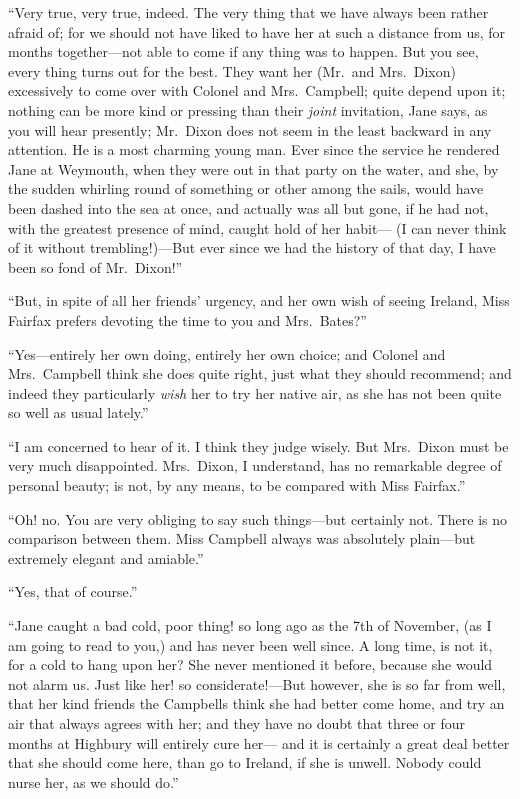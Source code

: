 ``Very true, very true, indeed.  The very thing that we have always
been rather afraid of; for we should not have liked to have her
at such a distance from us, for months together---not able to come
if any thing was to happen.  But you see, every thing turns out
for the best.  They want her (Mr.\ and Mrs.\ Dixon) excessively to
come over with Colonel and Mrs.\ Campbell; quite depend upon it;
nothing can be more kind or pressing than their \emph{joint} invitation,
Jane says, as you will hear presently; Mr.\ Dixon does not seem in the
least backward in any attention.  He is a most charming young man.
Ever since the service he rendered Jane at Weymouth, when they were
out in that party on the water, and she, by the sudden whirling
round of something or other among the sails, would have been dashed
into the sea at once, and actually was all but gone, if he had not,
with the greatest presence of mind, caught hold of her habit---%
(I can never think of it without trembling!)---But ever since we
had the history of that day, I have been so fond of Mr.\ Dixon!''

``But, in spite of all her friends' urgency, and her own wish
of seeing Ireland, Miss Fairfax prefers devoting the time to you
and Mrs.\ Bates?''

``Yes---entirely her own doing, entirely her own choice; and Colonel
and Mrs.\ Campbell think she does quite right, just what they
should recommend; and indeed they particularly \emph{wish} her to try
her native air, as she has not been quite so well as usual lately.''

``I am concerned to hear of it.  I think they judge wisely.
But Mrs.\ Dixon must be very much disappointed.  Mrs.\ Dixon,
I understand, has no remarkable degree of personal beauty; is not,
by any means, to be compared with Miss Fairfax.''

``Oh! no.  You are very obliging to say such things---but certainly not.
There is no comparison between them.  Miss Campbell always was
absolutely plain---but extremely elegant and amiable.''

``Yes, that of course.''

``Jane caught a bad cold, poor thing! so long ago as the 7th
of November, (as I am going to read to you,) and has never been
well since.  A long time, is not it, for a cold to hang upon her?
She never mentioned it before, because she would not alarm us.
Just like her! so considerate!---But however, she is so far from well,
that her kind friends the Campbells think she had better come home,
and try an air that always agrees with her; and they have no doubt
that three or four months at Highbury will entirely cure her---%
and it is certainly a great deal better that she should come here,
than go to Ireland, if she is unwell. Nobody could nurse her, as we
should do.''

